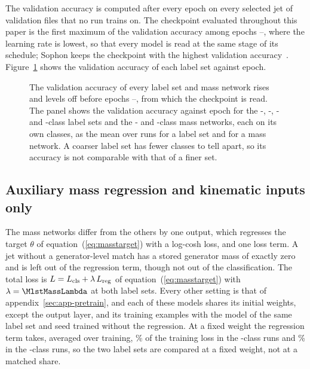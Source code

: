The validation accuracy is computed after every epoch on every selected jet of \DesignVtwoNValFiles{}
validation files that no run trains on. The checkpoint evaluated throughout this paper is the first
maximum of the validation accuracy among epochs \DesignWavgFirstEpoch--\DesignWavgLastEpoch, where the
learning rate is lowest, so that every model is read at the same stage of its schedule; Sophon keeps the
checkpoint with the highest validation accuracy~\cite[App.~B.1]{sophon}. Figure~\ref{fig:VAL} shows the
validation accuracy of each label set against epoch.

\begin{figure}[tbp]
\centering
{}
\caption{The validation accuracy of every label set and mass network rises and levels off before epochs
\DesignWavgFirstEpoch--\DesignWavgLastEpoch, from which the checkpoint is read. The panel shows the validation accuracy against epoch for the \Kfull-,
\Kres-, \Kmid- and
\Kcoarse-class label sets and the \Kres- and \Kcoarse-class mass networks, each on
its own classes, as the mean over \MlstNRunsWord{} runs for a label set and \MlstMassNRunsWord{} for a mass
network. A coarser label set has fewer classes to tell apart, so its accuracy is not comparable with that of a finer
set.}
\label{fig:VAL}
\end{figure}

\subsection{Auxiliary mass regression and kinematic inputs only}\label{sec:app-variants}

The mass networks differ from the others by one output, which regresses the
target $\theta$ of equation~(\ref{eq:masstarget}) with a log-cosh loss, and one loss term. A jet without a
generator-level match has a stored generator mass of exactly zero and is left out of the regression term,
though not out of the classification. The total loss is $L = L_{\mathrm{cls}} + \lambda\,L_{\mathrm{reg}}$ of
equation~(\ref{eq:masstarget}) with $\lambda = \MlstMassLambda$ at both label sets. Every other setting is that of appendix~\ref{sec:app-pretrain}, and each of these
models shares its initial weights, except the output layer, and its training examples with the model of
the same label set and seed trained without the regression. At a fixed weight the regression term takes, averaged over training, \MlstMassLossShareResMass\% of the training
loss in the \Kres-class runs and \MlstMassLossShareCoarseMass\% in the \Kcoarse-class runs, so the two label sets
are compared at a fixed weight, not at a matched share. %

